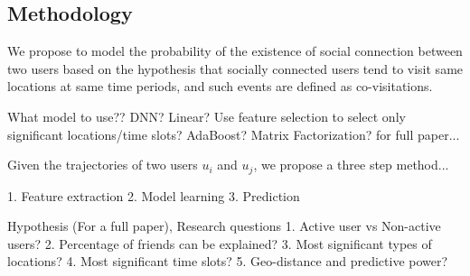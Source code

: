 \subsection{Methodology} \label{sec:framework}

We propose to model the probability of the existence of social connection between two users based on the hypothesis that socially connected users tend to visit same locations at same time periods, and such events are defined as co-visitations.  

What model to use?? DNN? Linear? 
Use feature selection to select only significant locations/time slots? AdaBoost?
Matrix Factorization? for full paper...

Given the trajectories of two users $u_i$ and $u_j$, we propose a three step method...

1. Feature extraction
2. Model learning
3. Prediction



Hypothesis (For a full paper), Research questions
1. Active user vs Non-active users?
2. Percentage of friends can be explained? 
3. Most significant types of locations?
4. Most significant time slots?
5. Geo-distance and predictive power?
